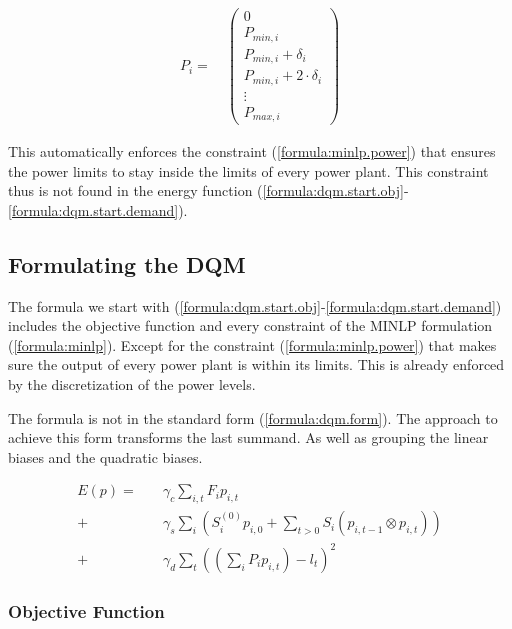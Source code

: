 \begin{align}
  P_i =
  \quad \begin{pmatrix}
    0 \\
    P_{min, i} \\
    P_{min, i} + \delta_i \\
    P_{min, i} + 2 \cdot \delta_i \\
    \vdots \\
    P_{max, i}
  \end{pmatrix}
\end{align}

This automatically enforces the constraint (\ref{formula:minlp.power}) that ensures the power limits to stay inside the limits of every power plant.
This constraint thus is not found in the energy function (\ref{formula:dqm.start.obj}-\ref{formula:dqm.start.demand}).

\subsection{Formulating the DQM}

The formula we start with (\ref{formula:dqm.start.obj}-\ref{formula:dqm.start.demand})
includes the objective function and every constraint of the MINLP formulation (\ref{formula:minlp}).
Except for the constraint (\ref{formula:minlp.power}) that makes sure the output of every power plant is within its limits.
This is already enforced by the discretization of the power levels.

The formula is not in the standard form (\ref{formula:dqm.form}).
The approach to achieve this form transforms the last summand.
As well as grouping the linear biases and the quadratic biases.

\begin{subequations}
\begin{align}
  E(p) =
  &  \quad \gamma_c \sum_{i, t} F_i p_{i, t}
  \label{formula:dqm.start.obj} \\
  + & \quad \gamma_s \sum_i \left(
      S_i^{(0)} p_{i, 0}
      + \sum_{t > 0} S_i \left( p_{i, t-1} \otimes p_{i, t} \right)
    \right)
  \label{formula:dqm.start.startup} \\
  + & \quad \gamma_d \sum_t \left( \left( \sum_i P_i p_{i, t} \right) - l_t \right)^2
  \label{formula:dqm.start.demand}
\end{align}
\end{subequations}

\subsubsection{Objective Function}

